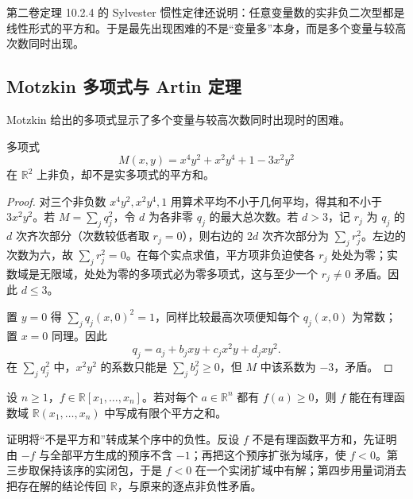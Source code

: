 第二卷定理 10.2.4 的 Sylvester 惯性定律还说明：任意变量数的实非负二次型都是线性形式的平方和。于是最先出现困难的不是“变量多”本身，而是多个变量与较高次数同时出现。

\subsection{Motzkin 多项式与 Artin 定理}
\label{b3:subsec:G03:02}

Motzkin 给出的多项式显示了多个变量与较高次数同时出现时的困难。

\begin{example}\label{b3:exm:motzkin-not-sos}
	多项式
	\[
		M(x,y)=x^4y^2+x^2y^4+1-3x^2y^2
	\]
	在 \(\mathbb R^2\) 上非负，却不是实多项式的平方和。
\end{example}
\begin{proof}
	对三个非负数 \(x^4y^2,x^2y^4,1\) 用算术平均不小于几何平均，得其和不小于 \(3x^2y^2\)。若 \(M=\sum_jq_j^2\)，令 \(d\) 为各非零 \(q_j\) 的最大总次数。若 \(d>3\)，记 \(r_j\) 为 \(q_j\) 的 \(d\) 次齐次部分（次数较低者取 \(r_j=0\)），则右边的 \(2d\) 次齐次部分为 \(\sum_jr_j^2\)。左边的次数为六，故 \(\sum_jr_j^2=0\)。在每个实点求值，平方项非负迫使各 \(r_j\) 处处为零；实数域是无限域，处处为零的多项式必为零多项式，这与至少一个 \(r_j\ne0\) 矛盾。因此 \(d\le3\)。

	置 \(y=0\) 得 \(\sum_jq_j(x,0)^2=1\)，同样比较最高次项便知每个 \(q_j(x,0)\) 为常数；置 \(x=0\) 同理。因此
	\[
		q_j=a_j+b_jxy+c_jx^2y+d_jxy^2.
	\]
	在 \(\sum_jq_j^2\) 中，\(x^2y^2\) 的系数只能是 \(\sum_jb_j^2\ge0\)，但 \(M\) 中该系数为 \(-3\)，矛盾。
\end{proof}

\begin{theorem}[Artin 定理]\label{b3:thm:artin-hilbert17}
	设 \(n\ge1\)，\(f\in\mathbb R[x_1,\ldots,x_n]\)。若对每个 \(a\in\mathbb R^n\) 都有 \(f(a)\ge0\)，则 \(f\) 能在有理函数域 \(\mathbb R(x_1,\ldots,x_n)\) 中写成有限个平方之和。
\end{theorem}

证明将“不是平方和”转成某个序中的负性。反设 \(f\) 不是有理函数平方和，先证明由 \(-f\) 与全部平方生成的预序不含 \(-1\)；再把这个预序扩张为域序，使 \(f<0\)。第三步取保持该序的实闭包，于是 \(f<0\) 在一个实闭扩域中有解；第四步用量词消去把存在解的结论传回 \(\mathbb R\)，与原来的逐点非负性矛盾。

